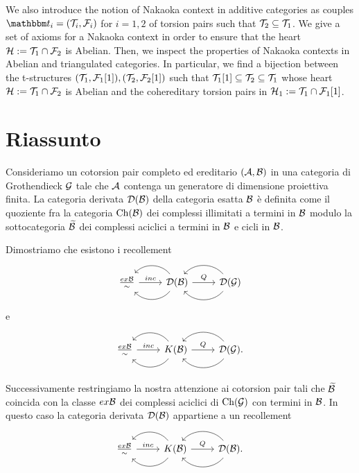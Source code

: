We also introduce the notion of Nakaoka context in additive categories as couples $\t_i=(\T_i,\F_i)$ for $i=1,2$ of torsion pairs such that $\mathcal{T}_2\subseteq \mathcal{T}_1$. We give a set of axioms for a Nakaoka context in order to ensure that the heart $\mathcal{H}:=\mathcal{T}_1\cap \mathcal{F}_2$ is Abelian. Then, we inspect the properties of Nakaoka contexts in Abelian and triangulated categories. In particular, we find a bijection between the t-structures $(\mathcal{T}_1,\mathcal{F}_1[1]), (\mathcal{T}_2,\mathcal{F}_2[1])$ such that $\mathcal{T}_1[1]\subseteq\mathcal{T}_2\subseteq\mathcal{T}_1$ whose heart $\mathcal{H}:=\mathcal{T}_1\cap\mathcal{F}_2$ is Abelian and the cohereditary torsion pairs in $\mathcal{H}_1:=\mathcal{T}_1\cap\mathcal{F}_1[1]$.

\endgroup

\cleardoublepage
{}
\begingroup
\let\clearpage\relax
\let\cleardoublepage\relax
\let\cleardoublepage\relax


\chapter*{Riassunto}

Consideriamo un cotorsion pair completo ed ereditario $(\mathcal{A},\mathcal{B})$ in una categoria di Grothendieck $\mathcal{G}$ tale che $\mathcal{A}$ contenga un generatore di dimensione proiettiva finita. La categoria derivata $\mathcal{D}(\mathcal{B})$ della categoria esatta $\mathcal{B}$ \`e definita come il quoziente fra la categoria $\mathrm{Ch}(\mathcal{B})$ dei complessi illimitati a termini in $\mathcal{B}$ modulo la sottocategoria $\widetilde{\mathcal{B}}$ dei complessi aciclici a termini in $\mathcal{B}$ e cicli in $\mathcal{B}$.

Dimostriamo che esistono i recollement
\begin{equation*}
  \begin{tikzcd}
    \frac{ex\B}{\sim}\arrow{r}{inc}
    & \D(\B)\arrow[bend left=50]{l}\arrow[bend right=50]{l}\arrow{r}{Q}
    & \D(\G)\arrow[bend left=50]{l}\arrow[bend right=50]{l}
  \end{tikzcd}
\end{equation*}
e
\begin{equation*}
  \begin{tikzcd}
    \frac{ex\B}{\sim}\arrow{r}{inc}
    & K(\B)\arrow[bend left=50]{l}\arrow[bend right=50]{l}\arrow{r}{Q}
    & \D(\G).\arrow[bend left=50]{l}\arrow[bend right=50]{l}
  \end{tikzcd}
\end{equation*}

Successivamente restringiamo la nostra attenzione ai cotorsion pair tali che $\widetilde{\mathcal{B}}$ coincida con la classe $ex\mathcal{B}$ dei complessi aciclici di $\mathrm{Ch}(\mathcal{G})$ con termini in $\mathcal{B}$. In questo caso la categoria derivata $\mathcal{D}(\mathcal{B})$ appartiene a un recollement
\begin{equation*}
  \begin{tikzcd}
    \frac{ex\B}{\sim}\arrow{r}{inc}
    & K(\B)\arrow[bend left=50]{l}\arrow[bend right=50]{l}\arrow{r}{Q}
    & \D(\B).\arrow[bend left=50]{l}\arrow[bend right=50]{l}
  \end{tikzcd}
\end{equation*}

